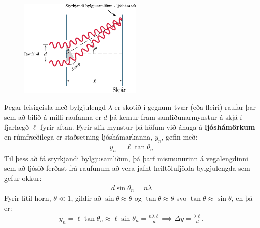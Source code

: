 \ifdefined \wholebook \else\documentclass[oneside]{book}\usepackage{EdlBook}\graphicspath{{figures/}}
\begin{document}
\begin{tcolorbox}
\begin{minipage}{\linewidth}
\begin{figure}
\vspace{-0.5cm}
\includegraphics[width = 2.3in]{figures/young-raufar.pdf}
\end{figure}
Þegar leisigeisla með bylgjulengd $\lambda$ er skotið í gegnum tvær (eða fleiri) raufar þar sem að bilið á milli raufanna er $d$ þá kemur fram samliðunarmynstur á skjá í fjarlægð $\ell$ fyrir aftan. Fyrir slík mynstur þá höfum við áhuga á \textbf{ljóshámörkum} en rúmfræðilega er staðsetning ljóshámarkanna, $y_n$, gefin með:
\begin{align*}
    y_n = \ell \tan\theta_n
\end{align*}
Til þess að fá styrkjandi bylgjusamliðun, þá þarf mismunurinn á vegalengdinni sem að ljósið ferðast frá raufunum að vera jafnt heiltölufjölda bylgjulengda sem gefur okkur:
\begin{align*}
   d\sin\theta_n = n \lambda
\end{align*}
Fyrir lítil horn, $\theta \ll 1$, gildir að $\sin\theta \approx \theta$ og $\tan\theta \approx \theta$ svo $\tan\theta \approx \sin\theta$, en þá er:
\begin{align*}
    y_n = \ell \tan\theta_n \approx \ell \sin\theta_n = \frac{n  \lambda \ell}{d} \implies \Delta y = \frac{\lambda \ell }{d}.
\end{align*}
\end{minipage}
\end{tcolorbox}
\end{document}
